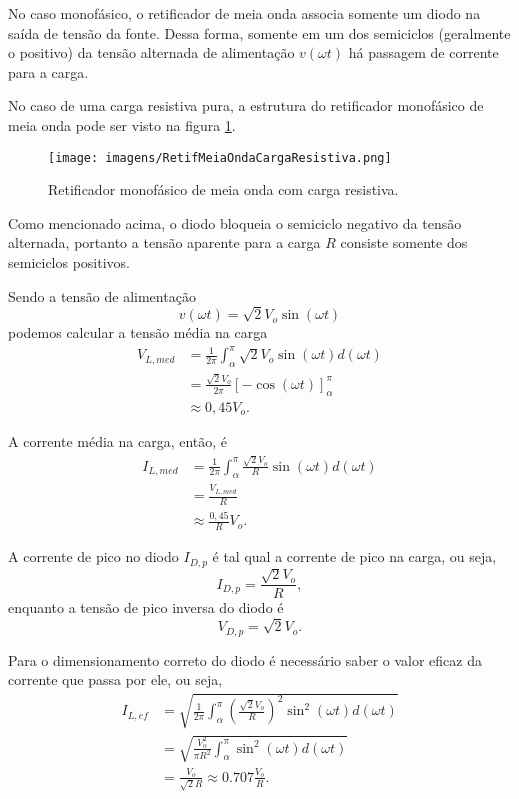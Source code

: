 
No caso monofásico, o retificador de meia onda associa somente um diodo na saída de tensão da fonte. Dessa forma, somente em um dos semiciclos (geralmente o positivo) da tensão alternada de alimentação $v\left( \omega t \right) $ há passagem de corrente para a carga.

No caso de uma carga resistiva pura, a estrutura do retificador monofásico de meia onda pode ser visto na figura \ref{fig:RMMOCR}.

\begin{figure}[htb]
\center
\texttt{[image: imagens/RetifMeiaOndaCargaResistiva.png]}
\caption{Retificador monofásico de meia onda com carga resistiva.}
\label{fig:RMMOCR}
\end{figure}

Como mencionado acima, o diodo bloqueia o semiciclo negativo da tensão alternada, portanto a tensão aparente para a carga $R$ consiste somente dos semiciclos positivos.

Sendo a tensão de alimentação \[
v(\omega t)=\sqrt{2}V_o\sin(\omega t) 
\] podemos calcular a tensão média na carga
\begin{align*}
    V_{L,med} &= \frac{1}{2\pi}\int_\alpha^{\pi}\sqrt{2}V_o\sin(\omega t)d(\omega t) \\
	     &= \frac{\sqrt{2}V_o}{2\pi}[-\cos(\omega t)]_\alpha^{\pi} \\
	     &\approx 0,45 V_o
.\end{align*}

A corrente média na carga, então, é
\begin{align*}
    I_{L,med} &= \frac{1}{2\pi}\int_\alpha^{\pi}\frac{\sqrt{2}V_o}{R}\sin(\omega t)d(\omega t) \\
    &= \frac{V_{L,med}}{R} \\
    &\approx \frac{0,45 }{R}V_o
.\end{align*}


A corrente de pico no diodo $I_{D,p}$ é tal qual a corrente de pico na carga, ou seja, \[
I_{D,p} = \frac{\sqrt{2}V_o}{R}
,\] enquanto a tensão de pico inversa do diodo é \[
    V_{D,p} = \sqrt{2}V_o
.\] 

Para o dimensionamento correto do diodo é necessário saber o valor eficaz da corrente que passa por ele, ou seja,
\begin{align*}
    I_{L, ef} &= \sqrt{\frac{1}{2\pi} \int_{\alpha}^{\pi}\left(  \frac{\sqrt{2}V_o}{R}\right) ^{2}\sin^{2}(\omega t)d(\omega t)} \\
&=\sqrt{\frac{V_o^{2}}{\pi R^{2}}\int_{\alpha}^{\pi}\sin^2(\omega t)d(\omega t)} \\
&= \frac{V_o}{\sqrt{2}R} \approx 0.707\frac{V_o}{R}
.\end{align*}

